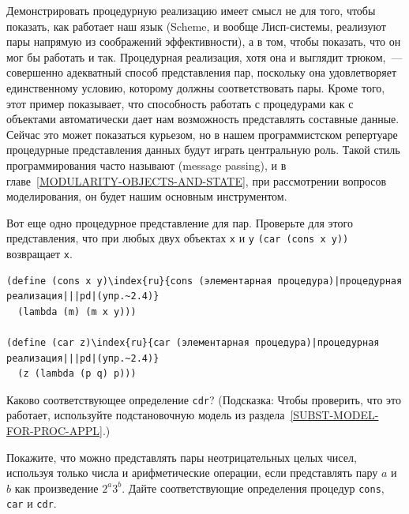 Демонстрировать процедурную реализацию имеет смысл не для того,
чтобы показать, как работает наш язык (Scheme,
и вообще Лисп-системы, реализуют пары напрямую из соображений
эффективности), а в том, чтобы показать, что он мог бы работать и
так.  Процедурная реализация, хотя она и выглядит трюком,~--- совершенно
адекватный способ представления пар, поскольку она удовлетворяет
единственному условию, которому должны соответствовать пары.  Кроме
того, этот пример показывает, что способность работать с процедурами
как с объектами автоматически дает нам возможность представлять
составные данные.  Сейчас это может показаться курьезом, но в нашем
программистском репертуаре процедурные представления данных будут
играть центральную роль.  Такой стиль программирования часто называют
 (message passing), 
и в главе~\ref{MODULARITY-OBJECTS-AND-STATE},
при рассмотрении вопросов моделирования, он будет нашим основным инструментом.
\begin{exercise}{2.4}\label{EX2.4}%
Вот еще одно процедурное представление для пар.
Проверьте для этого представления, что при любых двух объектах
{\tt x} и {\tt y} {\tt (car (cons x y))}
возвращает {\tt x}.

\begin{Verbatim}[fontsize=\small]
(define (cons x y)\index{ru}{cons (элементарная процедура)|процедурная реализация|||pd|(упр.~2.4)}
  (lambda (m) (m x y)))

(define (car z)\index{ru}{car (элементарная процедура)|процедурная реализация|||pd|(упр.~2.4)}
  (z (lambda (p q) p)))
\end{Verbatim}
Каково соответствующее определение {\tt cdr}? 
(Подсказка: Чтобы 
проверить, что это работает, используйте подстановочную модель из
раздела~\ref{SUBST-MODEL-FOR-PROC-APPL}.)
\end{exercise}
\begin{exercise}{2.5}\label{EX2.5}%
Покажите, что можно представлять пары неотрицательных
целых чисел, используя только числа и арифметические операции, если
представлять пару $a$ и $b$ как
произведение $2^a 3^b$.  Дайте соответствующие определения
процедур {\tt cons}, {\tt car} и 
{\tt cdr}.
\end{exercise}
